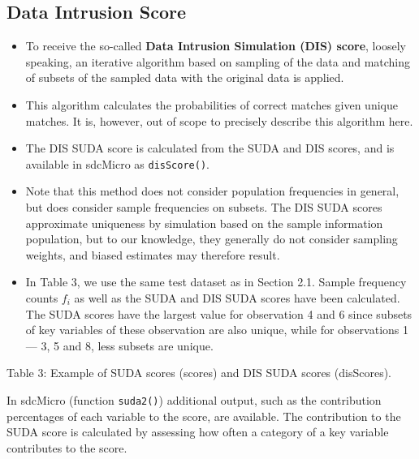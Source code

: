 \documentclass[]{article}
\begin{document}
\subsection*{Data Intrusion Score}
\begin{itemize} 
\item To receive the so-called
\textbf{Data Intrusion Simulation (DIS) score}, loosely speaking, an iterative algorithm
based on sampling of the data and matching of subsets of the sampled data with
the original data is applied. 
\item This algorithm calculates the probabilities of correct
matches given unique matches. It is, however, out of scope to precisely describe
this algorithm here. %
\item The DIS SUDA score is calculated from the SUDA and DIS scores, and is available in sdcMicro as \texttt{disScore()}.
\item Note that this method does not consider population frequencies in general, but
does consider sample frequencies on subsets. The DIS SUDA scores approximate
uniqueness by simulation based on the sample information population, but to our
knowledge, they generally do not consider sampling weights, and biased estimates
may therefore result.

\item In Table 3, we use the same test dataset as in Section 2.1. Sample frequency
counts $f_i$ as well as the SUDA and DIS SUDA scores have been calculated. The
SUDA scores have the largest value for observation 4 and 6 since subsets of key
variables of these observation are also unique, while for observations 1 — 3, 5 and
8, less subsets are unique.
\end{itemize}
Table 3: Example of SUDA scores (scores) and DIS SUDA scores (disScores).


In sdcMicro (function \texttt{suda2()}) additional output, such as the contribution
percentages of each variable to the score, are available. The contribution to the
SUDA score is calculated by assessing how often a category of a key variable
contributes to the score.
\newpage
\end{document}
